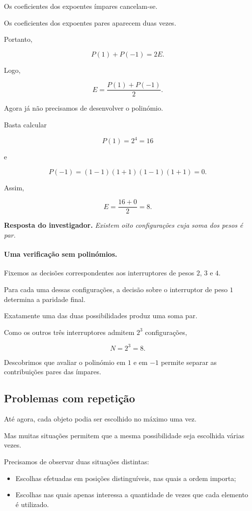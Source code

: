 \documentclass[11pt,a4paper,oneside]{book}
\newcommand{\Resposta}[1]{\textcolor{verdeescuro}{\textbf{Resposta do investigador.}} \emph{#1}\par}
\begin{document}
Os coeficientes dos expoentes ímpares
cancelam-se.

Os coeficientes dos expoentes pares
aparecem duas vezes.

Portanto,

\[
P(1)+P(-1)=2E.
\]

Logo,

\[
E=\frac{P(1)+P(-1)}{2}.
\]

Agora já não precisamos
de desenvolver o polinómio.

Basta calcular

\[
P(1)=2^4=16
\]

e

\[
P(-1)=(1-1)(1+1)(1-1)(1+1)=0.
\]

Assim,

\[
E=\frac{16+0}{2}=\boxed{8}.
\]

\Resposta{Existem oito configurações
cuja soma dos pesos é par.}

\paragraph{Uma verificação sem polinómios.}

Fixemos as decisões correspondentes
aos interruptores de pesos $2$, $3$ e $4$.

Para cada uma dessas configurações,
a decisão sobre o interruptor
de peso $1$ determina a paridade final.

Exatamente uma das duas possibilidades
produz uma soma par.

Como os outros três interruptores
admitem $2^3$ configurações,

\[
N=2^3=8.
\]

Descobrimos que avaliar o polinómio
em $1$ e em $-1$ permite separar
as contribuições pares das ímpares.

\subsection{Problemas com repetição}

Até agora, cada objeto podia ser
escolhido no máximo uma vez.

Mas muitas situações permitem que
a mesma possibilidade seja escolhida
várias vezes.

Precisamos de observar duas situações
distintas:

\begin{itemize}
\item Escolhas efetuadas em posições
distinguíveis, nas quais a ordem importa;

\item Escolhas nas quais apenas interessa
a quantidade de vezes que cada elemento
é utilizado.
\end{itemize}
\end{document}
